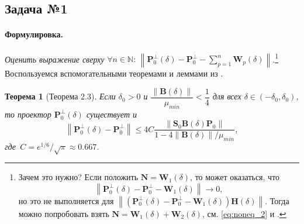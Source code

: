 \documentclass[specialist,
substylefile = spbu_report.rtx,
subf,href,colorlinks=true, 12pt]{disser}
\newcommand\norm[1]{\left\|#1\right\|}
\newtheorem{theorem}{Теорема}
\newenvironment{formulation}{\paragraph{Формулировка.}}{\hfill}
\begin{document}
	\subsection{Задача №1}
	\begin{formulation}
		\emph{Оценить выражение сверху }$\forall n\in\mathbb{N}:\,\norm{\mathbf{P}_0^\bot(\delta) - \mathbf{P}_0^\bot - \sum\limits^n_{p=1}\mathbf{W}_p(\delta)}$.\footnote{Зачем это нужно? Если положить $\mathbf{N}=\mathbf{W}_1(\delta)$, то может оказаться, что 
			\begin{equation*}
				\norm{\mathbf{P}_0^\bot(\delta) - \mathbf{P}_0^\bot - \mathbf{W}_1(\delta)}\to 0,
			\end{equation*}
			но это не выполняется для $\norm{(\mathbf{P}_0^\bot(\delta) - \mathbf{P}_0^\bot - \mathbf{W}_1(\delta))\mathbf{H}(\delta)}$.
			Тогда можно попробовать взять $\mathbf{N}=\mathbf{W}_1(\delta)+\mathbf{W}_2(\delta)$, см. \eqref{eq:noneq_2} и \cite{ZNekrutkin}.}
	\end{formulation}
	\\
	Воспользуемся вспомогательными теоремами и леммами из \cite{Nekrutkin10}.
	\begin{theorem}[Теорема 2.3]
		\label{th:1}
		\rm \emph{Если} $\delta_0 > 0$ \emph{и} $\dfrac{\norm{\mathbf{B}(\delta)}}{\mu_{min}} < \dfrac{1}{4}$ \emph{для всех} $\delta \in (-\delta_0, \delta_0)$\emph{, то проектор} $\mathbf{P}^\bot_0(\delta)$ \emph{существует и} \begin{equation}\norm{\mathbf{P}_0^\bot(\delta) - \mathbf{P}_0^\bot} \leqslant 4C\dfrac{\norm{\mathbf{S}_0\mathbf{B}(\delta)\mathbf{P}_0}}{1 - 4\norm{\mathbf{B}(\delta)}/\mu_{min}}\label{eq:6},
		\end{equation}
		\emph{где} $\,C = e^{1/6}/\sqrt{\pi}\approx0.667$.
	\end{theorem}
	
\end{document}
